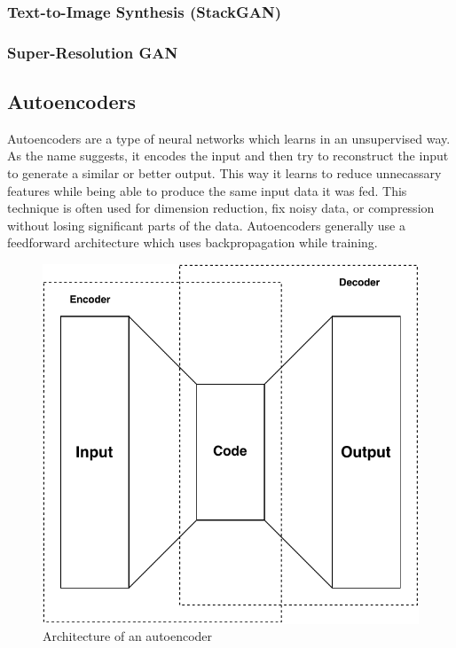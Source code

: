 \documentclass[conference]{IEEEtran}
\begin{document}
\subsubsection{Text-to-Image Synthesis (StackGAN)}

\subsubsection{Super-Resolution GAN}

\subsection{Autoencoders}
Autoencoders are a type of neural networks which learns in an unsupervised way. As the name suggests, it encodes the input and then try to reconstruct the input to generate a similar or better output. This way it learns to reduce unnecassary features while being able to produce the same input data it was fed. This technique is often used for dimension reduction, fix noisy data, or compression without losing significant parts of the data. Autoencoders generally use a feedforward architecture which uses backpropagation while training.

\begin{figure}[!h]
    \centerline{\includegraphics[scale=0.6]{figures/AE.pdf}}
    \caption{Architecture of an autoencoder}
    \label{fig4}
\end{figure}
\end{document}
